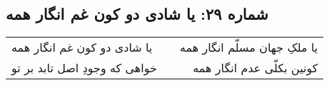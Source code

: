 \begin{center}
\section*{شماره ۲۹: یا شادی دو کون غم انگار همه}
\label{sec:029}
\begin{longtable}{l p{0.5cm} r}
یا شادی دو کون غم انگار همه
&&
یا ملکِ جهان مسلّم انگار همه
\\
خواهی که وجودِ اصل تابد بر تو
&&
کونین بکلّی عدم انگار همه
\\
\end{longtable}
\end{center}
